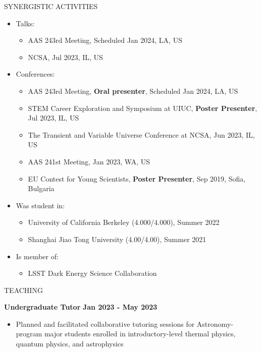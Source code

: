 \documentclass[10pt]{article} %
\begin{document}
\begin{section}{SYNERGISTIC ACTIVITIES}
    
\begin{itemize}[leftmargin=1.5em]
    \item Talks: 
    \begin{itemize}[leftmargin=1.5em]
        \item AAS 243rd Meeting, Scheduled Jan 2024, LA, US
        \item NCSA, Jul 2023, IL, US
    \end{itemize}
    \item Conferences: 
    \begin{itemize}[leftmargin=1.5em]
        \item AAS 243rd Meeting, \textbf{Oral presenter}, Scheduled Jan 2024, LA, US
        \item STEM Career Exploration and Symposium at UIUC, \textbf{Poster Presenter}, Jul 2023, IL, US
        \item The Transient and Variable Universe Conference at NCSA, Jun 2023, IL, US
        \item AAS 241st Meeting, Jan 2023, WA, US
        \item EU Contest for Young Scientists, \textbf{Poster Presenter}, Sep 2019, Sofia, Bulgaria
    \end{itemize}
    \item Was student in: 
    \begin{itemize}[leftmargin=1.5em]
        \item University of California Berkeley (4.000/4.000), Summer 2022
        \item Shanghai Jiao Tong University (4.00/4.00), Summer 2021
    \end{itemize}
    \item Is member of: 
    \begin{itemize}[leftmargin=1.5em]
        \item LSST Dark Energy Science Collaboration
    \end{itemize}
\end{itemize}

\begin{section}{TEACHING}

\textbf{Undergraduate Tutor} \hfill \textbf{Jan 2023 - May 2023}
\begin{itemize}[leftmargin=1.5em]
    \item Planned and facilitated collaborative tutoring sessions for Astronomy-program major students enrolled in introductory-level thermal physics, quantum physics, and astrophysics
\end{itemize}


\end{section}
\end{section}
\end{document}
